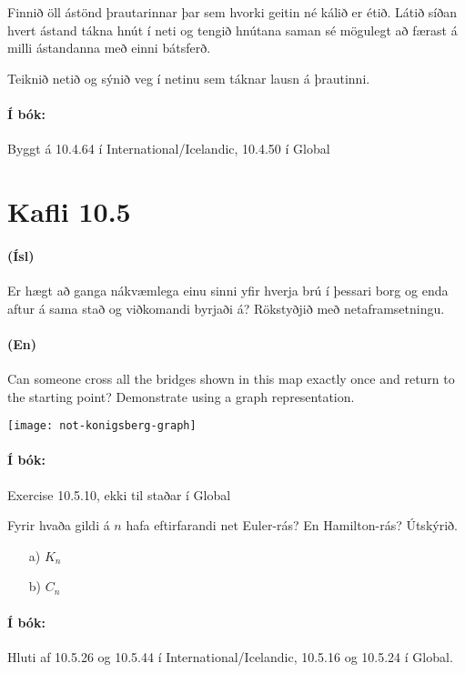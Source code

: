 \documentclass{article}
\begin{document}
Finnið öll ástönd þrautarinnar þar sem hvorki geitin né kálið er étið. Látið síðan hvert ástand tákna hnút í neti og tengið hnútana saman sé mögulegt að færast á milli ástandanna með einni bátsferð.

Teiknið netið og sýnið veg í netinu sem táknar lausn á þrautinni.

\paragraph{Í bók:} Byggt á 10.4.64 í International/Icelandic, 10.4.50 í Global

\section{Kafli 10.5}

\question 

\paragraph{(Ísl)} Er hægt að ganga nákvæmlega einu sinni yfir hverja brú í þessari borg og enda aftur á sama stað og viðkomandi byrjaði á? Rökstyðjið með netaframsetningu.

\paragraph{(En)} Can someone cross all the bridges shown in this map exactly once and return to the starting point? Demonstrate using a graph representation.

\begin{center}
\texttt{[image: not-konigsberg-graph]}
\end{center}

\paragraph{Í bók:} Exercise 10.5.10, ekki til staðar í Global

\question Fyrir hvaða gildi á $n$ hafa eftirfarandi net Euler-rás? En Hamilton-rás? Útskýrið.

\begin{itemize}
 \item[a)] $K_n$
 \item[b)] $C_n$
\end{itemize}

\paragraph{Í bók:} Hluti af 10.5.26 og 10.5.44 í International/Icelandic, 10.5.16 og 10.5.24 í Global.
\end{document}
